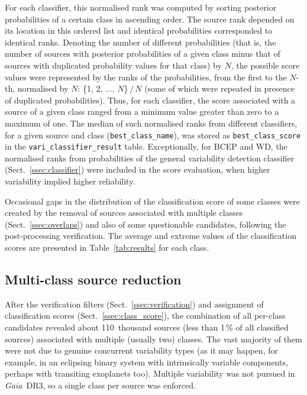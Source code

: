 \documentclass[longauth]{aa}
\def\gdr3{\textit{Gaia}~DR3\xspace}
\begin{document}
For each classifier, this normalised rank was computed by sorting posterior probabilities of a certain class in ascending order. The source rank depended on its location in this ordered list and identical probabilities corresponded to identical ranks. Denoting the number of different probabilities (that is, the number of sources with posterior probabilities of a given class minus that of sources with duplicated probability values for that class) by $N$, the possible score values were represented by the ranks of the probabilities, from the first to the $N$-th, normalised by $N$: \{1, 2, ..., $N$\}\,$/$\,$N$ (some of which were repeated in presence of duplicated probabilities). Thus, for each classifier, the score associated with a source of a given class ranged from a minimum value greater than zero to a maximum of one. 
%
The median of such normalised ranks from different classifiers, for a given source and class (\texttt{best\_class\_name}), was stored as \texttt{best\_class\_score} in the \texttt{vari\_classifier\_result} table. 
Exceptionally, for BCEP and WD, the normalised ranks from probabilities of the general variability detection classifier (Sect.~\ref{ssec:classifier}) were included in the score evaluation, when higher variability implied higher reliability.

Occasional gaps in the distribution of the classification score of some classes were created by the removal of sources associated with multiple classes (Sect.~\ref{ssec:overlaps}) and also of some questionable candidates, following the  post-processing verification.  The average and extreme values of the classification scores are presented in Table~\ref{tab:results} for each class.


\subsection{Multi-class source reduction\label{ssec:overlaps}}

After the verification filters (Sect.~\ref{ssec:verification}) and assignment of classification scores (Sect.~\ref{ssec:class_score}), the combination of all per-class candidates revealed about 110~thousand sources (less than 1\,\% of all classified sources) associated with multiple (usually two) classes. The vast majority of them were not due to genuine concurrent variability types (as it may happen, for example, in an eclipsing binary system with intrinsically variable components, perhaps with transiting exoplanets too). 
Multiple variability was not pursued in \gdr3, so a single class per source was enforced.
\end{document}
